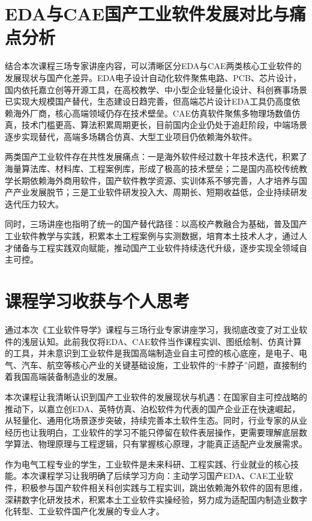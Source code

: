 \documentclass[12pt,a4paper]{article}
\begin{document}
\section{EDA与CAE国产工业软件发展对比与痛点分析}
结合本次课程三场专家讲座内容，可以清晰区分EDA与CAE两类核心工业软件的发展现状与国产化差异。EDA电子设计自动化软件聚焦电路、PCB、芯片设计，国内依托嘉立创等开源工具，在高校教学、中小型企业轻量化设计、科创赛事场景已实现大规模国产替代，生态建设日趋完善，但高端芯片设计EDA工具仍高度依赖海外厂商，核心高端领域仍存在技术壁垒。CAE仿真软件聚焦多物理场数值仿真，技术门槛更高、算法积累周期更长，目前国内企业仍处于追赶阶段，中端场景逐步实现替代，高端多场耦合仿真、大型工业项目仍依赖海外软件。

两类国产工业软件存在共性发展痛点：一是海外软件经过数十年技术迭代，积累了海量算法库、材料库、工程案例库，形成了极高的技术壁垒；二是国内高校传统教学长期依赖海外商用软件，国产软件教学资源、实训体系不够完善，人才培养与国产产业发展脱节；三是工业软件研发投入大、周期长、短期收益低，企业持续研发迭代压力较大。

同时，三场讲座也指明了统一的国产替代路径：以高校产教融合为基础，普及国产工业软件教学与实践，积累本土工程案例与实测数据，培育本土技术人才，通过人才储备与工程实践双向赋能，推动国产工业软件持续迭代升级，逐步实现全领域自主可控。

\section{课程学习收获与个人思考}
通过本次《工业软件导学》课程与三场行业专家讲座学习，我彻底改变了对工业软件的浅层认知。此前我仅将EDA、CAE软件当作课程实训、图纸绘制、仿真计算的工具，并未意识到工业软件是我国高端制造业自主可控的核心底座，是电子、电气、汽车、航空等核心产业的关键基础设施，工业软件的“卡脖子”问题，直接制约着我国高端装备制造业的发展。

本次课程让我清晰认识到国产工业软件的发展现状与机遇：在国家自主可控战略的推动下，以嘉立创EDA、英特仿真、泊松软件为代表的国产企业正在快速崛起，从轻量化、通用化场景逐步突破，持续完善本土软件生态。同时，行业专家的从业经历也让我明白，工业软件的学习不能只停留在软件表层操作，更需要理解底层数学算法、物理原理与工程逻辑，只有掌握核心原理，才能真正适配产业发展需求。

作为电气工程专业的学生，工业软件是未来科研、工程实践、行业就业的核心技能。本次课程学习让我明确了后续学习方向：主动学习国产EDA、CAE工业软件，积极参与国产软件相关科创实践与工程实训，跳出依赖海外软件的固有思维，深耕数字化研发技术，积累本土工业软件实操经验，努力成为适配国内制造业数字化转型、工业软件国产化发展的专业人才。
\end{document}
